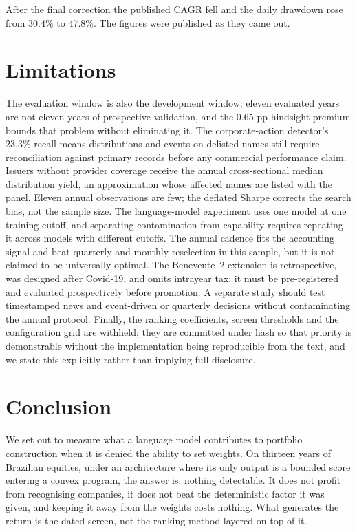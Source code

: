 \documentclass[10pt,conference]{IEEEtran}
\begin{document}
After the final correction the published CAGR fell and the daily drawdown rose from 30.4\% to 47.8\%. The figures were published as they came out.

\section{Limitations}

The evaluation window is also the development window; eleven evaluated years are not eleven years of prospective validation, and the 0.65 pp hindsight premium bounds that problem without eliminating it. The corporate-action detector's 23.3\% recall means distributions and events on delisted names still require reconciliation against primary records before any commercial performance claim. Issuers without provider coverage receive the annual cross-sectional median distribution yield, an approximation whose affected names are listed with the panel. Eleven annual observations are few; the deflated Sharpe corrects the search bias, not the sample size. The language-model experiment uses one model at one training cutoff, and separating contamination from capability requires repeating it across models with different cutoffs. The annual cadence fits the accounting signal and beat quarterly and monthly reselection in this sample, but it is not claimed to be universally optimal. The Benevente~2 extension is retrospective, was designed after Covid-19, and omits intrayear tax; it must be pre-registered and evaluated prospectively before promotion. A separate study should test timestamped news and event-driven or quarterly decisions without contaminating the annual protocol. Finally, the ranking coefficients, screen thresholds and the configuration grid are withheld; they are committed under hash so that priority is demonstrable without the implementation being reproducible from the text, and we state this explicitly rather than implying full disclosure.

\section{Conclusion}

We set out to measure what a language model contributes to portfolio construction when it is denied the ability to set weights. On thirteen years of Brazilian equities, under an architecture where its only output is a bounded score entering a convex program, the answer is: nothing detectable. It does not profit from recognising companies, it does not beat the deterministic factor it was given, and keeping it away from the weights costs nothing. What generates the return is the dated screen, not the ranking method layered on top of it.
\end{document}
